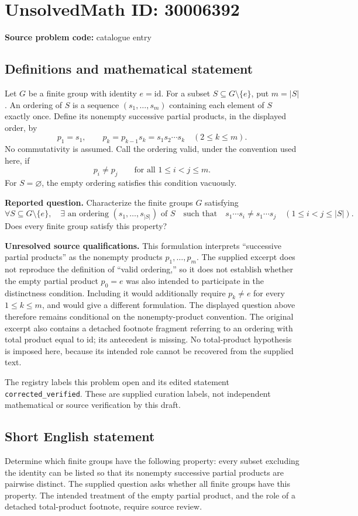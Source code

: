 \documentclass[11pt]{article}
\begin{document}
\section*{UnsolvedMath ID: 30006392}
\textbf{Source problem code:} catalogue entry
\subsection{Definitions and mathematical statement}
Let \(G\) be a finite group with identity \(e=\mathrm{id}\). For a subset \(S\subseteq G\setminus\{e\}\), put \(m=|S|\). An ordering of \(S\) is a sequence \((s_1,\ldots,s_m)\) containing each element of \(S\) exactly once. Define its nonempty successive partial products, in the displayed order, by
\[
p_1=s_1,\qquad p_k=p_{k-1}s_k=s_1s_2\cdots s_k\quad(2\leq k\leq m).
\]
No commutativity is assumed. Call the ordering valid, under the convention used here, if
\[
p_i\neq p_j\qquad\text{for all }1\leq i<j\leq m.
\]
For \(S=\varnothing\), the empty ordering satisfies this condition vacuously.

\textbf{Reported question.} Characterize the finite groups \(G\) satisfying
\[
\forall S\subseteq G\setminus\{e\},\quad
\exists\text{ an ordering }(s_1,\ldots,s_{|S|})\text{ of }S
\quad\text{such that}\quad
s_1\cdots s_i\neq s_1\cdots s_j
\quad(1\leq i<j\leq |S|).
\]
Does every finite group satisfy this property?

\textbf{Unresolved source qualifications.} This formulation interprets ``successive partial products'' as the nonempty products \(p_1,\ldots,p_m\). The supplied excerpt does not reproduce the definition of ``valid ordering,'' so it does not establish whether the empty partial product \(p_0=e\) was also intended to participate in the distinctness condition. Including it would additionally require \(p_k\neq e\) for every \(1\leq k\leq m\), and would give a different formulation. The displayed question above therefore remains conditional on the nonempty-product convention. The original excerpt also contains a detached footnote fragment referring to an ordering with total product equal to \(\mathrm{id}\); its antecedent is missing. No total-product hypothesis is imposed here, because its intended role cannot be recovered from the supplied text.

The registry labels this problem open and its edited statement \texttt{corrected\_verified}. These are supplied curation labels, not independent mathematical or source verification by this draft.
\subsection{Short English statement}
Determine which finite groups have the following property: every subset excluding the identity can be listed so that its nonempty successive partial products are pairwise distinct. The supplied question asks whether all finite groups have this property. The intended treatment of the empty partial product, and the role of a detached total-product footnote, require source review.
\end{document}

